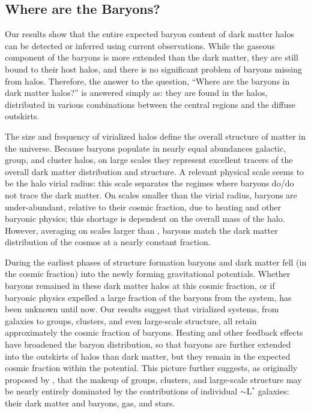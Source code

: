 \subsection{Where are the Baryons?}
\label{sec:Implications.Where}

Our results show that the entire expected baryon content of dark
matter halos can be detected or inferred using current
observations. While the gaseous component of the baryons is more
extended than the dark matter, they are still bound to their host
halos, and there is no significant problem of baryons missing from
halos. Therefore, the answer to the question, ``Where are the baryons
in dark matter halos?'' is answered simply as: they are found in
the halos, distributed in various combinations between the central
regions and the diffuse outskirts.

The size and frequency of virialized halos define the overall
structure of matter in the universe. Because baryons populate in
nearly equal abundances galactic, group, and cluster halos, on large
scales they represent excellent tracers of the overall dark matter
distribution and structure. A relevant physical scale seems to be the
halo virial radius: this scale separates the regimes where baryons
do/do not trace the dark matter. On scales smaller than the virial
radius, baryons are under-abundant, relative to their cosmic fraction,
due to heating and other baryonic physics; this shortage is dependent
on the overall mass of the halo. However, averaging on scales larger
than \rvir{}, baryons match the dark matter distribution of the cosmos
at a nearly constant fraction.

During the earliest phases of structure formation baryons and dark
matter fell (in the cosmic fraction) into the newly forming
gravitational potentials. Whether baryons remained in these dark
matter halos at this cosmic fraction, or if baryonic physics expelled
a large fraction of the baryons from the system, has been unknown
until now. Our results suggest that virialized systems, from galaxies
to groups, clusters, and even large-scale structure, all retain
approximately the cosmic fraction of baryons. Heating and other
feedback effects have broadened the baryon distribution, so that
baryons are further extended into the outskirts of halos than dark
matter, but they remain in the expected cosmic fraction within the
potential. This picture further suggests, as originally proposed by
\citet{Bahcall2014}, that the makeup of groups, clusters, and
large-scale structure may be nearly entirely dominated by the
contributions of individual $\sim$L$^*$ galaxies: their dark matter
and baryons, gas, and stars.
